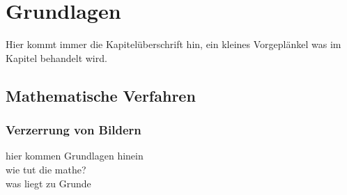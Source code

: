 \chapter{Grundlagen}
\begin{Spacing}{\mylinespace}

Hier kommt immer die Kapitelüberschrift hin, ein kleines Vorgeplänkel was im Kapitel behandelt wird.

\section{Mathematische Verfahren}

\subsection{Verzerrung von Bildern}

hier kommen Grundlagen hinein\\
wie tut die mathe?\\
was liegt zu Grunde\\
\end{Spacing}
\newpage
\clearpage
